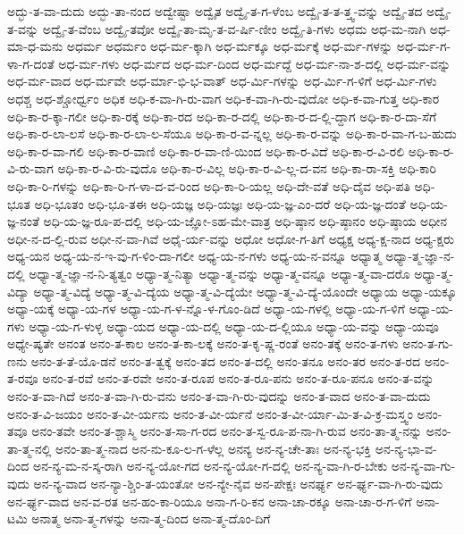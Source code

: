 {ಅದ್ಭು-ತ-ವಾ-ದುದು
ಅದ್ಭು-ತಾ-ನಂದ
ಅದ್ವೇಷ್ಟಾ
ಅದ್ವೈತ
ಅದ್ವೈ-ತ-ಗ-ಳೆಂಬ
ಅದ್ವೈ-ತ-ತ-ತ್ತ್ವ-ವನ್ನು
ಅದ್ವೈ-ತದ
ಅದ್ವೈ-ತ-ವನ್ನು
ಅದ್ವೈ-ತ-ವೆಂಬ
ಅದ್ವೈ-ತವೋ
ಅದ್ವೈ-ತಾ-ಮೃ-ತ-ವ-ರ್ಷಿ-ಣೀಂ
ಅದ್ವೈ-ತಿ-ಗಳು
ಅಧಮ
ಅಧ-ಮ-ನಾಗಿ
ಅಧ-ಮಾ-ಧ-ಮನು
ಅಧರ್ಮ
ಅಧರ್ಮಂ
ಅಧ-ರ್ಮ-ಕ್ಕಾಗಿ
ಅಧ-ರ್ಮಕ್ಕೂ
ಅಧ-ರ್ಮಕ್ಕೆ
ಅಧ-ರ್ಮ-ಗಳನ್ನು
ಅಧ-ರ್ಮ-ಗ-ಳಾ-ಗ-ದಂತೆ
ಅಧ-ರ್ಮ-ಗಳು
ಅಧ-ರ್ಮದ
ಅಧ-ರ್ಮ-ದಿಂದ
ಅಧ-ರ್ಮದ್ದೆ
ಅಧ-ರ್ಮ-ನಾ-ಶ-ದಲ್ಲಿ
ಅಧ-ರ್ಮ-ವನ್ನು
ಅಧ-ರ್ಮ-ವಾದ
ಅಧ-ರ್ಮವೇ
ಅಧ-ರ್ಮಾ-ಭಿ-ಭ-ವಾತ್
ಅಧ-ರ್ಮಿ-ಗಳನ್ನು
ಅಧ-ರ್ಮಿ-ಗ-ಳಿಗೆ
ಅಧ-ರ್ಮಿ-ಗಳು
ಅಧಶ್ಚ
ಅಧ-ಶ್ಚೋರ್ಧ್ವಂ
ಅಧಿಕ
ಅಧಿ-ಕ-ವಾ-ಗಿ-ರು-ವಾಗ
ಅಧಿ-ಕ-ವಾ-ಗಿ-ರು-ವುದೋ
ಅಧಿ-ಕ-ವಾ-ಗುತ್ತ
ಅಧಿ-ಕಾರ
ಅಧಿ-ಕಾ-ರ-ಕ್ಕಾ-ಗಲೀ
ಅಧಿ-ಕಾ-ರಕ್ಕೆ
ಅಧಿ-ಕಾ-ರದ
ಅಧಿ-ಕಾ-ರ-ದಲ್ಲಿ
ಅಧಿ-ಕಾ-ರ-ದ-ಲ್ಲಿ-ದ್ದಾಗ
ಅಧಿ-ಕಾ-ರ-ದಾ-ಸೆಗೆ
ಅಧಿ-ಕಾ-ರ-ಲಾ-ಲಸೆ
ಅಧಿ-ಕಾ-ರ-ಲಾ-ಲ-ಸೆಯೂ
ಅಧಿ-ಕಾ-ರ-ವ-ನ್ನಲ್ಲ
ಅಧಿ-ಕಾ-ರ-ವನ್ನು
ಅಧಿ-ಕಾ-ರ-ವಾ-ಗ-ಬ-ಹುದು
ಅಧಿ-ಕಾ-ರ-ವಾ-ಗಲಿ
ಅಧಿ-ಕಾ-ರ-ವಾಣಿ
ಅಧಿ-ಕಾ-ರ-ವಾ-ಣಿ-ಯಿಂದ
ಅಧಿ-ಕಾ-ರ-ವಿದೆ
ಅಧಿ-ಕಾ-ರ-ವಿ-ರಲಿ
ಅಧಿ-ಕಾ-ರ-ವಿ-ರು-ವಾಗ
ಅಧಿ-ಕಾ-ರ-ವಿ-ರು-ವುದೊ
ಅಧಿ-ಕಾ-ರ-ವಿಲ್ಲ
ಅಧಿ-ಕಾ-ರ-ವಿ-ಲ್ಲ-ದ-ವನ
ಅಧಿ-ಕಾ-ರಾ-ಸಕ್ತಿ
ಅಧಿ-ಕಾರಿ
ಅಧಿ-ಕಾ-ರಿ-ಗಳನ್ನು
ಅಧಿ-ಕಾ-ರಿ-ಗ-ಳಾ-ದ-ವ-ರಿಂದ
ಅಧಿ-ಕಾ-ರಿ-ಯಲ್ಲ
ಅಧಿ-ದೇ-ವತೆ
ಅಧಿ-ದೈವ
ಅಧಿ-ಪತಿ
ಅಧಿ-ಭೂತ
ಅಧಿ-ಭೂತಂ
ಅಧಿ-ಭೂ-ತಈ
ಅಧಿ-ಯಜ್ಞ
ಅಧಿ-ಯಜ್ಞಃ
ಅಧಿ-ಯ-ಜ್ಞ-ಎಂ-ದರೆ
ಅಧಿ-ಯ-ಜ್ಞ-ದಂತೆ
ಅಧಿ-ಯ-ಜ್ಞ-ನಂತೆ
ಅಧಿ-ಯ-ಜ್ಞ-ರೂ-ಪ-ದಲ್ಲಿ
ಅಧಿ-ಯ-ಜ್ಞೋ-ಽಹ-ಮೇ-ವಾತ್ರ
ಅಧಿ-ಷ್ಠಾನ
ಅಧಿ-ಷ್ಠಾನಂ
ಅಧಿ-ಷ್ಠಾಯ
ಅಧೀನ
ಅಧೀ-ನ-ದ-ಲ್ಲಿ-ರುವ
ಅಧೀ-ನ-ವಾ-ಗಿವೆ
ಅಧೈ-ರ್ಯ-ವನ್ನು
ಅಧೋ
ಅಧೋ-ಗ-ತಿಗೆ
ಅಧ್ಯಕ್ಷ
ಅಧ್ಯ-ಕ್ಷ-ನಾದ
ಅಧ್ಯ-ಕ್ಷರು
ಅಧ್ಯ-ಯನ
ಅಧ್ಯ-ಯ-ನ-ಇ-ವು-ಗ-ಳಿಂ-ದಾ-ಗಲೀ
ಅಧ್ಯ-ಯ-ನ-ಗಳು
ಅಧ್ಯ-ಯ-ನ-ವನ್ನೂ
ಅಧ್ಯಾತ್ಮ
ಅಧ್ಯಾ-ತ್ಮ-ಜ್ಞಾ-ನ-ದಲ್ಲಿ
ಅಧ್ಯಾ-ತ್ಮ-ಜ್ಞಾ-ನ-ನಿ-ತ್ಯತ್ವಂ
ಅಧ್ಯಾ-ತ್ಮ-ನಿತ್ಯಾ
ಅಧ್ಯಾ-ತ್ಮ-ವನ್ನು
ಅಧ್ಯಾ-ತ್ಮ-ವನ್ನೂ
ಅಧ್ಯಾ-ತ್ಮ-ವಾ-ದರೊ
ಅಧ್ಯಾ-ತ್ಮ-ವಿದ್ಯಾ
ಅಧ್ಯಾ-ತ್ಮ-ವಿದ್ಯೆ
ಅಧ್ಯಾ-ತ್ಮ-ವಿ-ದ್ಯೆಯ
ಅಧ್ಯಾ-ತ್ಮ-ವಿ-ದ್ಯೆಯೇ
ಅಧ್ಯಾ-ತ್ಮ-ವಿ-ದ್ಯೆ-ಯೊಂದೇ
ಅಧ್ಯಾಯ
ಅಧ್ಯಾ-ಯಕ್ಕೂ
ಅಧ್ಯಾ-ಯಕ್ಕೆ
ಅಧ್ಯಾ-ಯ-ಗಳ
ಅಧ್ಯಾ-ಯ-ಗ-ಳ-ನ್ನೊ-ಳ-ಗೊಂ-ಡಿದೆ
ಅಧ್ಯಾ-ಯ-ಗಳಲ್ಲಿ
ಅಧ್ಯಾ-ಯ-ಗ-ಳಿಗೆ
ಅಧ್ಯಾ-ಯ-ಗಳು
ಅಧ್ಯಾ-ಯ-ಗ-ಳುಳ್ಳ
ಅಧ್ಯಾ-ಯದ
ಅಧ್ಯಾ-ಯ-ದಲ್ಲಿ
ಅಧ್ಯಾ-ಯ-ದ-ಲ್ಲಿಯೂ
ಅಧ್ಯಾ-ಯ-ವನ್ನು
ಅಧ್ಯಾ-ಯವೂ
ಅಧ್ಯೇ-ಷ್ಯತೇ
ಅನಂತ
ಅನಂ-ತ-ಕಾಲ
ಅನಂ-ತ-ಕಾ-ಲಕ್ಕೆ
ಅನಂ-ತ-ಕೃ-ಷ್ಣ-ರಂತೆ
ಅನಂ-ತಕ್ಕೆ
ಅನಂ-ತ-ಗಳು
ಅನಂ-ತ-ಗು-ಣನು
ಅನಂ-ತ-ತೆ-ಯೊ-ಡನೆ
ಅನಂ-ತ-ತ್ವಕ್ಕೆ
ಅನಂ-ತದ
ಅನಂ-ತ-ದಲ್ಲಿ
ಅನಂ-ತನೂ
ಅನಂ-ತರ
ಅನಂ-ತ-ರದ
ಅನಂ-ತ-ರವೂ
ಅನಂ-ತ-ರವೆ
ಅನಂ-ತ-ರವೇ
ಅನಂ-ತ-ರೂಪ
ಅನಂ-ತ-ರೂ-ಪನು
ಅನಂ-ತ-ರೂ-ಪನೂ
ಅನಂ-ತ-ವನ್ನು
ಅನಂ-ತ-ವಾ-ಗಿದೆ
ಅನಂ-ತ-ವಾ-ಗಿ-ರು-ವನು
ಅನಂ-ತ-ವಾ-ಗಿ-ರು-ವುದನ್ನು
ಅನಂ-ತ-ವಾದ
ಅನಂ-ತ-ವಾ-ದುದು
ಅನಂ-ತ-ವಿ-ಜಯಂ
ಅನಂ-ತ-ವೀ-ರ್ಯನು
ಅನಂ-ತ-ವೀ-ರ್ಯನೆ
ಅನಂ-ತ-ವೀ-ರ್ಯಾ-ಮಿ-ತ-ವಿ-ಕ್ರ-ಮಸ್ತ್ವಂ
ಅನಂ-ತವೂ
ಅನಂ-ತವೇ
ಅನಂ-ತ-ಶ್ಚಾಸ್ಮಿ
ಅನಂ-ತ-ಸಾ-ಗ-ರದ
ಅನಂ-ತ-ಸ್ವ-ರೂ-ಪ-ನಾ-ಗಿ-ರುವ
ಅನಂ-ತಾ-ತ್ಮ-ನನ್ನು
ಅನಂ-ತಾ-ತ್ಮ-ನಲ್ಲಿ
ಅನಂ-ತಾ-ತ್ಮ-ನಾದ
ಅನ-ನು-ಕೂ-ಲ-ಗ-ಳೆಲ್ಲ
ಅನನ್ಯ
ಅನ-ನ್ಯ-ಚೇ-ತಾಃ
ಅನ-ನ್ಯ-ಭಕ್ತಿ
ಅನ-ನ್ಯ-ಭಾ-ವ-ದಿಂದ
ಅನ-ನ್ಯ-ಮ-ನ-ಸ್ಕ-ರಾಗಿ
ಅನ-ನ್ಯ-ಯೋ-ಗದ
ಅನ-ನ್ಯ-ಯೋ-ಗ-ದಲ್ಲಿ
ಅನ-ನ್ಯ-ವಾ-ಗಿ-ರ-ಬೇಕು
ಅನ-ನ್ಯ-ವಾ-ಗು-ವುದು
ಅನ-ನ್ಯ-ವಾದ
ಅನ-ನ್ಯಾ-ಶ್ಚಿಂ-ತ-ಯಂತೋ
ಅನ-ನ್ಯೇ-ನೈವ
ಅನ-ಪೇಕ್ಷಃ
ಅನರ್ಘ್ಯ
ಅನ-ರ್ಘ್ಯ-ವಾ-ಗಿ-ರು-ವುದು
ಅನ-ರ್ಘ್ಯ-ವಾದ
ಅನ-ವ-ರತ
ಅನ-ಹಂ-ಕಾ-ರಿಯೂ
ಅನಾ-ಗ-ರಿ-ಕನ
ಅನಾ-ಚಾ-ರಕ್ಕೂ
ಅನಾ-ಚಾ-ರ-ಗ-ಳಿಗೆ
ಅನಾ-ಟಮಿ
ಅನಾತ್ಮ
ಅನಾ-ತ್ಮ-ಗಳನ್ನು
ಅನಾ-ತ್ಮ-ದಿಂದ
ಅನಾ-ತ್ಮ-ದೊಂ-ದಿಗೆ
}
